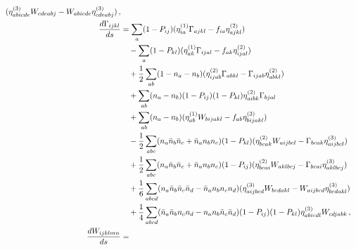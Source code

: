 \begin{align}
\begin{aligned}
    (\genthree_{abicde} W_{cdeabj} - W_{abicde} \genthree_{cdeabj})\,,
  \end{aligned}\label{eq:imsrg3_1body} \\
   & \begin{aligned}
    \mathllap{\frac{d\Gamma_{ijkl}}{ds}} & =
    \sum_{a}(1 - P_{ij})(\genone_{ia}\Gamma_{ajkl} - f_{ia}\gentwo_{ajkl})                                                                            \\
                                         & \quad - \sum_{a}(1 - P_{kl})(\genone_{ak}\Gamma_{ijal} - f_{ak}\gentwo_{ijal})                             \\
                                         & \quad + \frac{1}{2}\sum_{ab}(1 - n_{a} - n_{b})(\gentwo_{ijab}\Gamma_{abkl} - \Gamma_{ijab}\gentwo_{abkl}) \\
                                         & \quad + \sum_{ab} (n_a - n_b)(1 - P_{ij})(1 - P_{kl})\gentwo_{aibk}\Gamma_{bjal}                           \\
                                         & \quad + \sum_{ab} (n_a - n_b)(\genone_{ab} W_{bijakl} - f_{ab} \genthree_{bijakl})                         \\
                                         & \quad - \frac{1}{2} \sum_{abc} (n_a \bar{n}_b \bar{n}_c + \bar{n}_a n_b n_c)
    (1 - P_{kl})(\gentwo_{bcak} W_{aijbcl} - \Gamma_{bcak} \genthree_{aijbcl})                                                                        \\
                                         & \quad + \frac{1}{2} \sum_{abc} (n_a \bar{n}_b \bar{n}_c + \bar{n}_a n_b n_c)
    (1 - P_{ij})(\gentwo_{bcai} W_{aklbcj} - \Gamma_{bcai} \genthree_{aklbcj})                                                                        \\
                                         & \quad + \frac{1}{6} \sum_{abcd}(n_a \bar{n}_b \bar{n}_c \bar{n}_d -\bar{n}_a n_b n_c n_d)
    (\genthree_{aijbcd} W_{bcdakl} - W_{aijbcd} \genthree_{bcdakl})                                                                                   \\
                                         & \quad + \frac{1}{4} \sum_{abcd}(\bar{n}_a \bar{n}_b n_c n_d -n_a n_b \bar{n}_c \bar{n}_d)
    (1 - P_{ij})(1 - P_{kl}) \genthree_{abicdl} W_{cdjabk}\,,
  \end{aligned}\label{eq:imsrg3_2body} \\
   & \begin{aligned}
    \mathllap{\frac{dW_{ijklmn}}{ds}} & =

\end{aligned}
\end{align}
